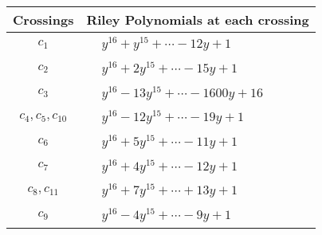 \documentclass[1p]{elsarticle_modified}
\theoremstyle{definition}
\begin{document}
\begin{tabular}{m{50pt}|m{274pt}}
Crossings & \hspace{64pt}Riley Polynomials at each crossing \\
\hline $$\begin{aligned}c_{1}\end{aligned}$$&$\begin{aligned}
&y^{16}+y^{15}+\cdots-12 y+1
\end{aligned}$\\
\hline $$\begin{aligned}c_{2}\end{aligned}$$&$\begin{aligned}
&y^{16}+2 y^{15}+\cdots-15 y+1
\end{aligned}$\\
\hline $$\begin{aligned}c_{3}\end{aligned}$$&$\begin{aligned}
&y^{16}-13 y^{15}+\cdots-1600 y+16
\end{aligned}$\\
\hline $$\begin{aligned}c_{4},c_{5},c_{10}\end{aligned}$$&$\begin{aligned}
&y^{16}-12 y^{15}+\cdots-19 y+1
\end{aligned}$\\
\hline $$\begin{aligned}c_{6}\end{aligned}$$&$\begin{aligned}
&y^{16}+5 y^{15}+\cdots-11 y+1
\end{aligned}$\\
\hline $$\begin{aligned}c_{7}\end{aligned}$$&$\begin{aligned}
&y^{16}+4 y^{15}+\cdots-12 y+1
\end{aligned}$\\
\hline $$\begin{aligned}c_{8},c_{11}\end{aligned}$$&$\begin{aligned}
&y^{16}+7 y^{15}+\cdots+13 y+1
\end{aligned}$\\
\hline $$\begin{aligned}c_{9}\end{aligned}$$&$\begin{aligned}
&y^{16}-4 y^{15}+\cdots-9 y+1
\end{aligned}$\\
\hline
\end{tabular}\\~\\
\end{document}
